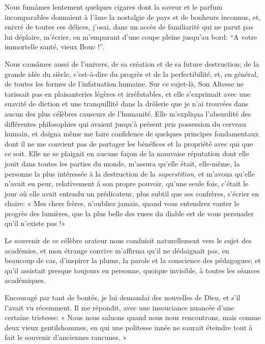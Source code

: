 Nous fumâmes lentement quelques cigares dont la saveur et le parfum
incomparables donnaient à l’âme la nostalgie de pays
et de bonheurs inconnus, et, enivré de toutes ces délices,
j’osai, dans un accès de familiarité qui ne parut pas
lui déplaire, m’écrier, en m’emparant
d’une coupe pleine jusqu’au bord: ``A
votre immortelle santé, vieux Bouc !''.

Nous causâmes aussi de l’univers, de sa création et de
sa future destruction; de la grande idée du siècle,
c’est{}-à{}-dire du progrès et de la perfectibilité,
et, en général, de toutes les formes de l’infatuation
humaine. Sur ce sujet{}-là, Son Altesse ne tarissait pas en
plaisanteries légères et irréfutables, et elle
s’exprimait avec une suavité de diction et une
tranquillité dans la drôlerie que je n’ai trouvées
dans aucun des plus célèbres causeurs de l’humanité.
Elle m’expliqua l’absurdité des
différentes philosophies qui avaient jusqu’à présent
pris possession du cerveau humain, et daigna même me faire confidence
de quelques principes fondamentaux dont il ne me convient pas de
partager les bénéfices et la propriété avec qui que ce soit. Elle ne se
plaignit en aucune façon de la mauvaise réputation dont elle jouit dans
toutes les parties du monde, m’assura
qu’elle était, elle{}-même, la personne la plus
intéressée à la destruction de la \textit{superstition}, et
m’avoua qu’elle
n’avait eu peur, relativement à son propre pouvoir,
qu’une seule fois, c’était le jour où
elle avait entendu un prédicateur, plus subtil que ses confrères,
s’écrier en chaire: « Mes chers frères,
n’oubliez jamais, quand vous entendrez vanter le
progrès des lumières, que la plus belle des ruses du diable est de vous
persuader qu’il n’existe pas !»

Le souvenir de ce célèbre orateur nous conduisit naturellement vers le
sujet des académies, et mon étrange convive m’affirma
qu’il ne dédaignait pas, en beaucoup de cas,
d’inspirer la plume, la parole et la conscience des
pédagogues; et qu’il assistait presque toujours en
personne, quoique invisible, à toutes les séances académiques.

Encouragé par tant de bontés, je lui demandai des nouvelles de Dieu, et
s’il l’avait vu récemment. Il me
répondit, avec une insouciance nuancée d’une certaine
tristesse: « Nous nous saluons quand nous nous rencontrons, mais comme
deux vieux gentilshommes, en qui une politesse innée ne saurait
éteindre tout à fait le souvenir d’anciennes rancunes.
»

